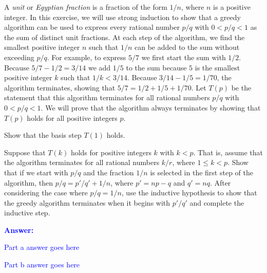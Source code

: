 \item{}
A \emph{unit} or \emph{Egyptian fraction} is a fraction of the form $1/n$,
where $n$ is a positive integer. In this exercise, we will use strong
induction to show that a greedy algorithm can be used to express every rational
number $p/q$ with $0 < p/q < 1$ as the sum of distinct unit fractions. At each
step of the algorithm, we find the smallest positive integer $n$ such that
$1/n$ can be added to the sum without exceeding $p/q$. For example, to express
$5/7$ we first start the sum with $1/2$. Because $5/7 - 1/2 = 3/14$ we add
$1/5$ to the sum because $5$ is the smallest positive integer $k$ such that
$1/k < 3/14$. Because $3/14 - 1/5 = 1/70$, the algorithm terminates, showing
that $5/7 = 1/2 + 1/5 + 1/70$.\parend
Let $T(p)$ be the statement that this algorithm terminates for all rational
numbers $p/q$ with $0 < p/q < 1$. We will prove that the algorithm always
terminates by showing that $T(p)$ holds for all positive integers $p$.
\begin{list}{\textbf{.}}{}
\item Show that the basis step $T(1)$ holds.
\item Suppose that $T(k)$ holds for positive integers $k$ with $k < p$. That
is, assume that the algorithm terminates for all rational numbers $k/r$, where
$1 \le k < p$. Show that if we start with $p/q$ and the fraction $1/n$ is
selected in the first step of the algorithm, then $p/q = p'/q' + 1/n$, where
$p' = np - q$ and $q' = nq$. After considering the case where $p/q = 1/n$, use
the inductive hypothesis to show that the greedy algorithm terminates when it
begins with $p'/q'$ and complete the inductive step.
\end{list}
\vskip12pt
\ifanswers
\textcolor{blue}{
\textbf{Answer:}\\[6pt]
\begin{list}{\textbf{.}}{}
\item Part a answer goes here
\item Part b answer goes here
\end{list}
}
\newpage
\fi
